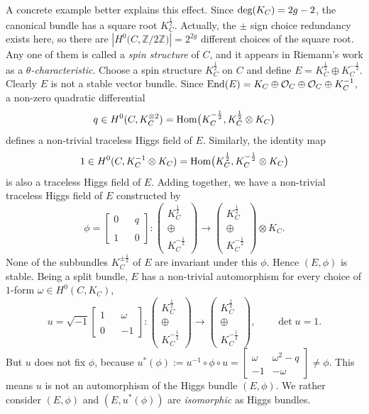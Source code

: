 \documentclass{amsart}
\theoremstyle{definition}
\numberwithin{equation}{section}
\numberwithin{figure}{section}
\def\Hom{{\text{\rm{Hom}}}}
\def\End{{\text{\rm{End}}}}
\def\tensor{\otimes}
\def\dsum{\oplus}
\def\deg{{\text{\rm{deg}}}}
\newcommand{\be}{\begin{equation}}
\newcommand{\ee}{\end{equation}}
\newcommand{\bZ}{{\mathbb{Z}}}
\newcommand{\cO}{{\mathcal{O}}}
\newcommand{\half}{{\frac{1}{2}}}
\newcommand{\lrar}{\longrightarrow}
\begin{document}
A concrete example better explains this effect. Since $\deg (K_C) = 2g-2$,
the canonical bundle has a square root $K_C^\half$. Actually, the $\pm$ sign choice
redundancy exists here, so there are $\left| H^0\big( C,\bZ\big/2\bZ\big)\right|=
2^{2g}$ different choices of the square root. Any one of them is called a
\emph{spin structure} of $C$, and it appears in Riemann's work
as a \emph{$\theta$-characteristic}. Choose a spin structure 
$K_C^\half$ on $C$ and  define $E=K_C^\half\dsum K_C^{-\half}$.
Clearly $E$ is not a stable vector bundle. Since
$\End(E) = K_C\dsum \cO_C\dsum \cO_C\dsum K_C^{-1}$, 
a non-zero quadratic differential 
$$
q\in H^0(C,K_C^{\tensor 2}) = \Hom\big(K_C^{-\half},K_C^{\half}
\tensor K_C\big)
$$ defines a non-trivial traceless Higgs field of $E$.
Similarly, the identity map 
$$
1\in H^0(C,K_C^{-1}\tensor K_C) = \Hom\big(K_C^{\half},K_C^{-\half}
\tensor K_C\big)
$$ is also a traceless Higgs field of $E$. Adding together, we have a non-trivial traceless Higgs field of $E$ constructed by
\be
\label{rank2section}
\phi = \begin{bmatrix}
0&&q\\
\\
1&&0
\end{bmatrix}:
\left(
\begin{matrix}
K_C^\half\\
\dsum\\
K_C^{-\half}
\end{matrix}
\right)
\lrar
\left(
\begin{matrix}
K_C^\half\\
\dsum\\
K_C^{-\half}
\end{matrix}
\right)
\tensor K_C.
\ee
None of the subbundles $K_C^{\pm\half}$ of $E$ are
invariant under this $\phi$. Hence $(E,\phi)$ is stable.
Being a split bundle, $E$ has a non-trivial automorphism 
for every choice of $1$-form $\omega\in H^0(C,K_C)$,
$$
u = \sqrt{-1}\begin{bmatrix}
1&&\omega\\
\\
0&&-1
\end{bmatrix}:
\left(
\begin{matrix}
K_C^\half\\
\dsum\\
K_C^{-\half}
\end{matrix}
\right)
\lrar
\left(
\begin{matrix}
K_C^\half\\
\dsum\\
K_C^{-\half}
\end{matrix}
\right),\qquad \det u = 1.
$$
But $u$ does not fix $\phi$, because
$u^*(\phi):=u^{-1}\circ \phi \circ u = \begin{bmatrix}
\omega&\omega^2-q\\
-1&-\omega
\end{bmatrix}\ne \phi
$. This means $u$ is not an automorphism of the Higgs bundle
$(E,\phi)$. We rather consider  $(E,\phi)$ and $(E,u^*(\phi))$
are \emph{isomorphic} as Higgs bundles.
\end{document}
